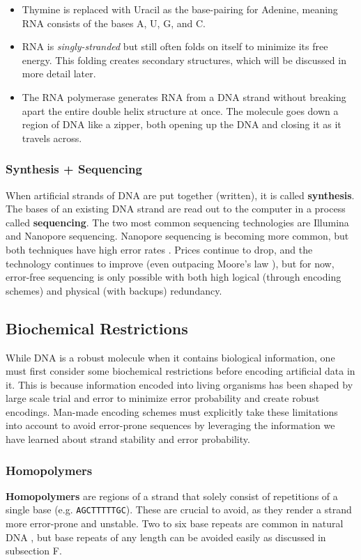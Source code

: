 \documentclass[a4paper,conference]{IEEEtran}
\begin{document}
\begin{itemize}
    \item Thymine is replaced with Uracil as the base-pairing for Adenine, meaning RNA consists of the bases A, U, G, and C.
    \item RNA is \textit{singly-stranded} but still often folds on itself to minimize its free energy. This folding creates secondary structures, which will be discussed in more detail later.
    \item The RNA polymerase generates RNA from a DNA strand without breaking apart the entire double helix structure at once. The molecule goes down a region of DNA like a zipper, both opening up the DNA and closing it as it travels across.
\end{itemize}

\subsubsection{Synthesis + Sequencing}
When artificial strands of DNA are put together (written), it is called \textbf{synthesis}. The bases of an existing DNA strand are read out to the computer in a process called \textbf{sequencing}. The two most common sequencing technologies are Illumina and Nanopore sequencing. Nanopore sequencing is becoming more common, but both techniques have high error rates \cite{pcrbased}. Prices continue to drop, and the technology continues to improve (even outpacing Moore's law \cite{dnabasedarchival}), but for now, error-free sequencing is only possible with both high logical (through encoding schemes) and physical (with backups) redundancy.

\subsection{Biochemical Restrictions}
While DNA is a robust molecule when it contains biological information, one must first consider some biochemical restrictions before encoding artificial data in it. This is because information encoded into living organisms has been shaped by large scale trial and error \cite{dnaevolution} to minimize error probability and create robust encodings. Man-made encoding schemes must explicitly take these limitations into account to avoid error-prone sequences by leveraging the information we have learned \cite{} about strand stability and error probability. \\

\subsubsection{Homopolymers}
\textbf{Homopolymers} are regions of a strand that solely consist of repetitions of a single base (e.g. \texttt{AGCTTTTTGC}). These are crucial to avoid, as they render a strand more error-prone \cite{homopolymererrors} and unstable. Two to six base repeats are common in natural DNA \cite{homopolymer}, but base repeats of any length can be avoided easily as discussed in subsection F.
\end{document}

